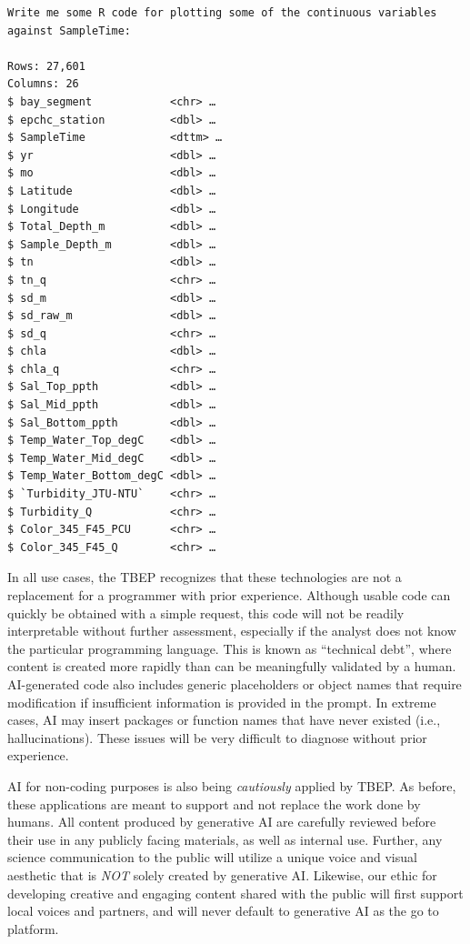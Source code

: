 \documentclass[
]{book}
\begin{document}
\begin{verbatim}
Write me some R code for plotting some of the continuous variables
against SampleTime:

Rows: 27,601
Columns: 26
$ bay_segment            <chr> …
$ epchc_station          <dbl> …
$ SampleTime             <dttm> …
$ yr                     <dbl> …
$ mo                     <dbl> …
$ Latitude               <dbl> …
$ Longitude              <dbl> …
$ Total_Depth_m          <dbl> …
$ Sample_Depth_m         <dbl> …
$ tn                     <dbl> …
$ tn_q                   <chr> …
$ sd_m                   <dbl> …
$ sd_raw_m               <dbl> …
$ sd_q                   <chr> …
$ chla                   <dbl> …
$ chla_q                 <chr> …
$ Sal_Top_ppth           <dbl> …
$ Sal_Mid_ppth           <dbl> …
$ Sal_Bottom_ppth        <dbl> …
$ Temp_Water_Top_degC    <dbl> …
$ Temp_Water_Mid_degC    <dbl> …
$ Temp_Water_Bottom_degC <dbl> …
$ `Turbidity_JTU-NTU`    <chr> …
$ Turbidity_Q            <chr> …
$ Color_345_F45_PCU      <chr> …
$ Color_345_F45_Q        <chr> …
\end{verbatim}

In all use cases, the TBEP recognizes that these technologies are not a replacement for a programmer with prior experience. Although usable code can quickly be obtained with a simple request, this code will not be readily interpretable without further assessment, especially if the analyst does not know the particular programming language. This is known as ``technical debt'', where content is created more rapidly than can be meaningfully validated by a human. AI-generated code also includes generic placeholders or object names that require modification if insufficient information is provided in the prompt. In extreme cases, AI may insert packages or function names that have never existed (i.e., hallucinations). These issues will be very difficult to diagnose without prior experience.

AI for non-coding purposes is also being \emph{cautiously} applied by TBEP. As before, these applications are meant to support and not replace the work done by humans. All content produced by generative AI are carefully reviewed before their use in any publicly facing materials, as well as internal use. Further, any science communication to the public will utilize a unique voice and visual aesthetic that is \emph{NOT} solely created by generative AI. Likewise, our ethic for developing creative and engaging content shared with the public will first support local voices and partners, and will never default to generative AI as the go to platform.
\end{document}
